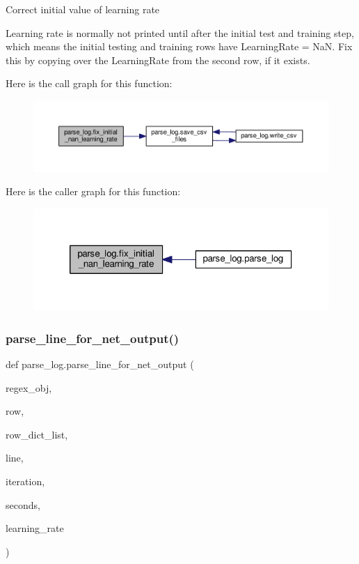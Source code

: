 \begin{DoxyVerb}Correct initial value of learning rate

Learning rate is normally not printed until after the initial test and
training step, which means the initial testing and training rows have
LearningRate = NaN. Fix this by copying over the LearningRate from the
second row, if it exists.
\end{DoxyVerb}
 Here is the call graph for this function\+:
\nopagebreak
\begin{figure}[H]
\begin{center}
\leavevmode
\includegraphics[width=350pt]{namespaceparse__log_a407b810ae0d4a92efe08385f7de5eabb_cgraph}
\end{center}
\end{figure}
Here is the caller graph for this function\+:
\nopagebreak
\begin{figure}[H]
\begin{center}
\leavevmode
\includegraphics[width=320pt]{namespaceparse__log_a407b810ae0d4a92efe08385f7de5eabb_icgraph}
\end{center}
\end{figure}
\mbox{\label{namespaceparse__log_a140116e322b21ebd36d194b65a5612fb}} 
\subsubsection{\texorpdfstring{parse\+\_\+line\+\_\+for\+\_\+net\+\_\+output()}{parse\_line\_for\_net\_output()}}
{\footnotesize\ttfamily def parse\+\_\+log.\+parse\+\_\+line\+\_\+for\+\_\+net\+\_\+output (\begin{DoxyParamCaption}\item[{}]{regex\+\_\+obj,  }\item[{}]{row,  }\item[{}]{row\+\_\+dict\+\_\+list,  }\item[{}]{line,  }\item[{}]{iteration,  }\item[{}]{seconds,  }\item[{}]{learning\+\_\+rate }\end{DoxyParamCaption})}

